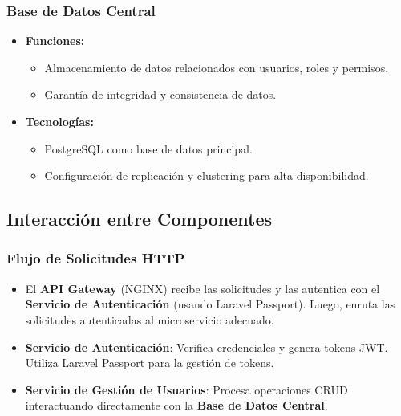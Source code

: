 \documentclass{article}
\begin{document}
\subsubsection{Base de Datos Central}
\begin{itemize}
    \item \textbf{Funciones:}
          \begin{itemize}
              \item Almacenamiento de datos relacionados con usuarios, roles y permisos.
              \item Garantía de integridad y consistencia de datos.
          \end{itemize}
    \item \textbf{Tecnologías:}
          \begin{itemize}
              \item PostgreSQL como base de datos principal.
              \item Configuración de replicación y clustering para alta disponibilidad.
          \end{itemize}
\end{itemize}

\subsection{Interacción entre Componentes}

\subsubsection{Flujo de Solicitudes HTTP}
\begin{itemize}
    \item El \textbf{API Gateway} (NGINX) recibe las solicitudes y las autentica con el \textbf{Servicio de Autenticación} (usando Laravel Passport). Luego, enruta las solicitudes autenticadas al microservicio adecuado.
    \item \textbf{Servicio de Autenticación}: Verifica credenciales y genera tokens JWT. Utiliza Laravel Passport para la gestión de tokens.
    \item \textbf{Servicio de Gestión de Usuarios}: Procesa operaciones CRUD interactuando directamente con la \textbf{Base de Datos Central}.
\end{itemize}
\end{document}
